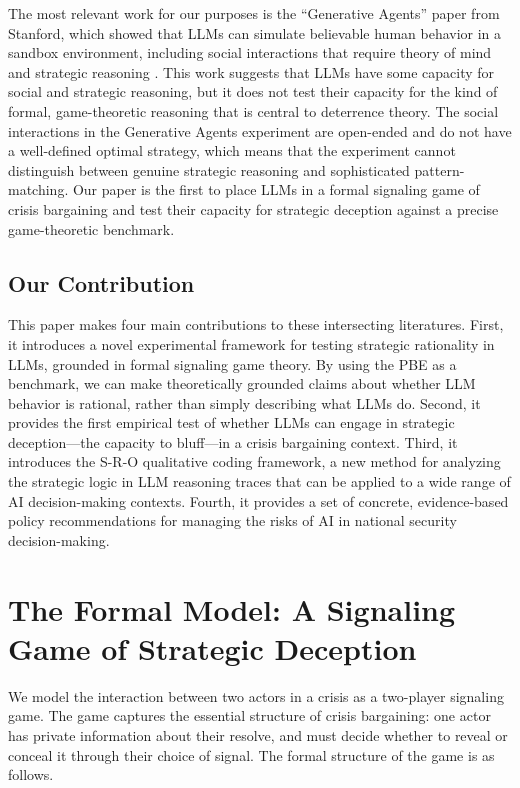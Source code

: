 \documentclass[12pt]{article}
\theoremstyle{plain}
\theoremstyle{definition}
\begin{document}
The most relevant work for our purposes is the ``Generative Agents'' paper from Stanford, which showed that LLMs can simulate believable human behavior in a sandbox environment, including social interactions that require theory of mind and strategic reasoning \citep{Park2023}. This work suggests that LLMs have some capacity for social and strategic reasoning, but it does not test their capacity for the kind of formal, game-theoretic reasoning that is central to deterrence theory. The social interactions in the Generative Agents experiment are open-ended and do not have a well-defined optimal strategy, which means that the experiment cannot distinguish between genuine strategic reasoning and sophisticated pattern-matching. Our paper is the first to place LLMs in a formal signaling game of crisis bargaining and test their capacity for strategic deception against a precise game-theoretic benchmark.

\subsection{Our Contribution}

This paper makes four main contributions to these intersecting literatures. First, it introduces a novel experimental framework for testing strategic rationality in LLMs, grounded in formal signaling game theory. By using the PBE as a benchmark, we can make theoretically grounded claims about whether LLM behavior is rational, rather than simply describing what LLMs do. Second, it provides the first empirical test of whether LLMs can engage in strategic deception---the capacity to bluff---in a crisis bargaining context. Third, it introduces the S-R-O qualitative coding framework, a new method for analyzing the strategic logic in LLM reasoning traces that can be applied to a wide range of AI decision-making contexts. Fourth, it provides a set of concrete, evidence-based policy recommendations for managing the risks of AI in national security decision-making.

\section{The Formal Model: A Signaling Game of Strategic Deception}

We model the interaction between two actors in a crisis as a two-player signaling game. The game captures the essential structure of crisis bargaining: one actor has private information about their resolve, and must decide whether to reveal or conceal it through their choice of signal. The formal structure of the game is as follows.
\end{document}

